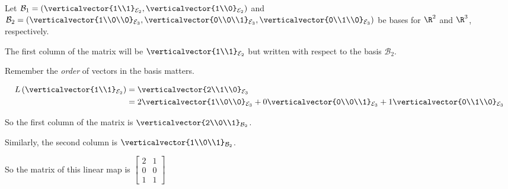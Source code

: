 \documentclass{ximera}
\begin{document}
\begin{question}
  Let $\mathcal{B}_1 = \left(\verticalvector{1\\1}_{\mathcal{E}_2},\verticalvector{1\\0}_{\mathcal{E}_2}\right)$ and $\mathcal{B}_2 = \left(\verticalvector{1\\0\\0}_{\mathcal{E}_3},\verticalvector{0\\0\\1}_{\mathcal{E}_3},\verticalvector{0\\1\\0}_{\mathcal{E}_3}\right)$ be bases
  for $\R^2$ and $\R^3$, respectively. 

  \begin{solution}
    \begin{hint}
      The first column of the matrix will be $\verticalvector{1\\1}_{\mathcal{E}_2}$ but written with respect to the basis $\mathcal{B}_2$.

      Remember the \textit{order} of vectors in the basis matters.
    \end{hint}

    \begin{hint}
      \begin{align*}
        L\left(\verticalvector{1\\1}_{\mathcal{E}_2}\right) &= \verticalvector{2\\1\\0}_{\mathcal{E}_3}\\
        &= 2\verticalvector{1\\0\\0}_{\mathcal{E}_3}+0\verticalvector{0\\0\\1}_{\mathcal{E}_3}+1\verticalvector{0\\1\\0}_{\mathcal{E}_3}\\
      \end{align*}
    \end{hint}
    \begin{hint}
      So the first column of the matrix is $\verticalvector{2\\0\\1}_{\mathcal{B}_2}$.
    \end{hint}
    \begin{hint}
      Similarly, the second column is $\verticalvector{1\\0\\1}_{\mathcal{B}_2}$.
    \end{hint}
    \begin{hint}
      So the matrix of this linear map is \(\begin{bmatrix} 2 & 1 \\0& 0\\ 1 & 1\end{bmatrix}\)
    \end{hint}


\end{solution}
\end{question}
\end{document}
